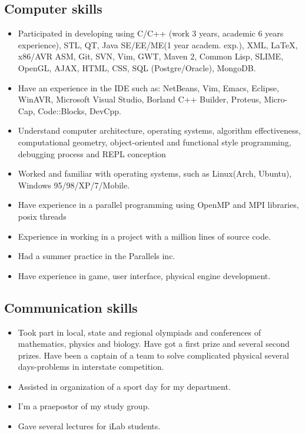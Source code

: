 \documentclass[letterpaper]{resume}
\begin{document}
\subsection{Computer skills}
\begin{itemize}
	\item Participated in developing using C/C++ (work 3 years, academic 6 years experience), STL, QT, Java SE/EE/ME(1 year academ. exp.), XML, \LaTeX, x86/AVR ASM, Git, SVN, Vim, GWT, Maven 2, Common Lisp, SLIME, OpenGL, AJAX, HTML, CSS, SQL (Postgre/Oracle), MongoDB.
	\item Have an experience in the IDE such as: NetBeans, Vim, Emacs, Eclipse, WinAVR, Microsoft Visual Studio, Borland C++ Builder, Proteus, Micro-Cap, Code::Blocks, DevCpp.
	\item Understand computer architecture, operating systems, algorithm effectiveness, computational geometry, object-oriented and functional style programming, debugging process and REPL conception
	\item Worked and familiar with operating systems, such as Linux(Arch, Ubuntu), Windows 95/98/XP/7/Mobile.
	\item Have experience in a parallel programming using OpenMP and MPI libraries, posix threads
	\item Experience in working in a project with a million lines of source code.
	\item Had a summer practice in the Parallels\textsuperscript{\textregistered} inc.
	\item Have experience in game, user interface, physical engine development.
\end{itemize}

\subsection{Communication skills}
\begin{itemize}
	\item Took part in local, state and regional olympiads and conferences of mathematics, physics and biology. Have got a first prize and several second prizes. Have been a captain of a team to solve complicated physical several days-problems in interstate competition.
	\item Assisted in organization of a sport day for my department.
	\item I'm a praepostor of my study group.
        \item Gave several lectures for iLab students.
\end{itemize}
\end{document}
